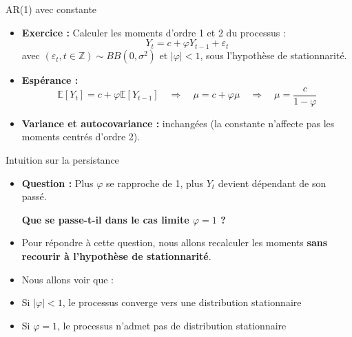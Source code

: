 \documentclass[11pt,aspectratio=169]{beamer}
\newcommand{\E}{\mathbb{E}}
\newcommand{\Z}{\mathbb{Z}}
\begin{document}
\begin{frame}{AR(1) avec constante}

\begin{itemize}

\item \textbf{Exercice :} Calculer les moments d'ordre 1 et 2 du processus :
\[
Y_t = c + \varphi Y_{t-1} + \varepsilon_t
\]
avec $(\varepsilon_t, t \in \Z) \sim BB(0, \sigma^2)$ et $|\varphi| < 1$, sous l'hypothèse de stationnarité.\newline

\item \textbf{Espérance :}
\[
\E[Y_t] = c + \varphi \E[Y_{t-1}] \quad \Rightarrow \quad \mu = c + \varphi \mu \quad \Rightarrow \quad \boxed{\mu = \frac{c}{1 - \varphi}}
\]

\item \textbf{Variance et autocovariance :} inchangées (la constante n'affecte pas les moments centrés d'ordre 2).

\end{itemize}
\end{frame}


\begin{frame}{Intuition sur la persistance}

\begin{itemize}

\item \textbf{Question :} Plus $\varphi$ se rapproche de 1, plus $Y_t$ devient dépendant de son passé.



\textbf{Que se passe-t-il dans le cas limite $\varphi = 1$ ?}\newline

\item Pour répondre à cette question, nous allons recalculer les moments \textbf{sans recourir à l'hypothèse de stationnarité}.\newline

\item Nous allons voir que :\newline

\item Si $|\varphi| < 1$, le processus converge vers une distribution stationnaire\newline

\item Si $\varphi = 1$, le processus n'admet pas de distribution stationnaire

\end{itemize}
\end{frame}
\end{document}
